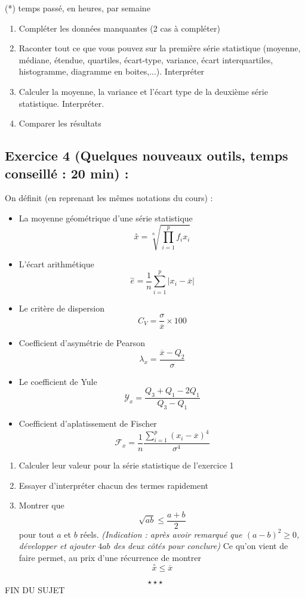 (*) temps passé, en heures, par semaine\newline
\begin{enumerate}
\item Compléter les données manquantes (2 cas à compléter)
\item Raconter tout ce que vous pouvez sur la première série statistique (moyenne, médiane, étendue, quartiles, écart-type, variance, écart interquartiles, histogramme, diagramme en boites,...). Interpréter
\item Calculer la moyenne, la variance et l'écart type de la deuxième série statistique. Interpréter.
\item Comparer les résultats
\end{enumerate}
\subsection*{Exercice 4 (Quelques nouveaux outils, temps conseillé : 20 min) : }
On définit (en reprenant les mêmes notations du cours) : 
\begin{itemize}
\item La moyenne géométrique d'une série statistique 
$$\overset{\circ}{x} = \sqrt[n]{\prod_{i=1}^p f_i x_i}$$
\item L'écart arithmétique 
$$\overset{\sim}{e} = \frac{1}{n}\sum_{i=1}^p |x_i - \overline{x}|$$
\item Le critère de dispersion 
$$C_V = \frac{\sigma}{\overline{x}}\times 100$$
\item Coefficient d'asymétrie de Pearson 
$$\lambda_x = \frac{\overline{x} - Q_2}{\sigma}$$
\item Le coefficient de Yule 
$$\mathscr{Y}_x = \frac{Q_3+Q_1-2Q_1}{Q_3-Q_1}$$
\item Coefficient d'aplatissement de Fischer
$$\mathscr{F}_x = \frac{1}{n}\frac{\displaystyle \sum_{i=1}^p (x_i - \overline{x})^4}{\sigma^4}$$
\end{itemize}
\begin{enumerate}
\item Calculer leur valeur pour la série statistique de l'exercice 1
\item Essayer d'interpréter chacun des termes rapidement
\item Montrer que 
$$\sqrt{ab} \leq \frac{a+b}{2}$$
pour tout $a$ et $b$ réels.
\emph{(Indication : après avoir remarqué que $(a-b)^2 \geq 0$, développer et ajouter $4ab$ des deux côtés pour conclure)}
Ce qu'on vient de faire permet, au prix d'une récurrence de montrer 
$$\overset{\circ}{x} \leq \overline{x}$$
\end{enumerate}
$$\star \star \star$$
\center
FIN DU SUJET
